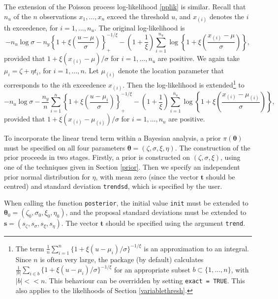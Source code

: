 \documentclass[11pt,a4paper]{article}
\newcommand{\bs}{\boldsymbol}
\begin{document}
The extension of the Poisson process log-likelihood \eqref{pplik} is
similar.  Recall that $n_u$ of the $n$ observations $x_1,\dots,x_n$
exceed the threshold $u$, and $x_{(i)}$ denotes the $i$th exceedence,
for $i=1,\dots,n_u$.  The original log-likelihood is
\begin{equation}
  -n_u\log \sigma - n_y\left\{1 +
    \xi\left(\frac{u-\mu}{\sigma}\right)\right\}_{+}^{-1/\xi} -
  \left(1+\frac{1}{\xi}\right) \sum_{i=1}^{n_u} \log\left\{1 +
    \xi\left(\frac{x_{(i)}-\mu}{\sigma}\right)\right\}, 
\label{pplik2}
\end{equation}
provided that $1 + \xi(x_{(i)}-\mu)/\sigma$ for $i=1,\dots,n_u$ are
positive.  We again take $\mu_i = \zeta + \eta t_i$, for
$i=1,\dots,n$.  Let $\mu_{(i)}$ denote the location parameter that
corresponds to the $i$th exceedence $x_{(i)}$.  Then the
log-likelihood is extended\footnote{The term $\frac{1}{n}
  \sum_{i=1}^{n} \{1 + \xi(u-\mu_{i})/\sigma \}^{-1/\xi}$ is an
  approximation to an integral. Since $n$ is often very large, the
  package (by default) calculates $\frac{1}{|b|} \sum_{i \in b} \{1 +
  \xi(u-\mu_{i})/\sigma \}^{-1/\xi}$ for an appropriate subset $b
  \subset \{1,\dots,n\}$, with $|b| << n$.  This behaviour can be
  overridden by setting \texttt{exact = TRUE}.  This also applies to
  the likelihoods of Section \ref{variablethresh}.} to
\begin{equation*}
  -n_u\log \sigma - \frac{n_y}{n} \sum_{i=1}^{n} \left\{1 +
    \xi\left(\frac{u-\mu_{i}}{\sigma}\right)\right\}_{+}^{-1/\xi} -
  \left(1+\frac{1}{\xi}\right) \sum_{i=1}^{n_u} \log\left\{1 +
    \xi\left(\frac{x_{(i)}-\mu_{(i)}}{\sigma}\right)\right\}, 
\end{equation*}
provided that $1 + \xi(x_{(i)}-\mu_{(i)})/\sigma$ for $i=1,\dots,n_u$
are positive.

To incorporate the linear trend term within a Bayesian analysis, a
prior $\pi(\bs{\theta})$ must be specified on all four parameters
$\bs{\theta} = (\zeta,\sigma,\xi,\eta)$.  The construction of the
prior proceeds in two stages.  Firstly, a prior is constructed on
$(\zeta,\sigma,\xi)$, using one of the techniques given in Section
\ref{prior}.  Then we specify an independent prior normal distribution
for $\eta$, with mean zero (since the vector $\bs{t}$ should be
centred) and standard deviation \verb+trendsd+, which is specified by
the user.

When calling the function \verb+posterior+, the initial value
\verb+init+ must be extended to $\bs{\theta}_0 =
(\zeta_0,\sigma_0,\xi_0,\eta_0)$, and the proposal standard deviations
must be extended to $\bs{s} = (s_\zeta,s_\sigma,s_\xi,s_\eta)$.  The
vector $\bs{t}$ should be specified using the argument \verb+trend+.
\end{document}
